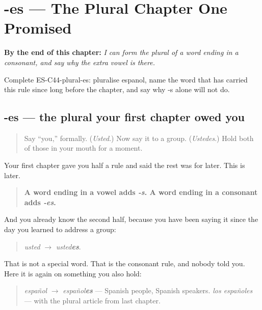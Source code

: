 
\chapter{-es --- The Plural Chapter One Promised}
\label{ch:plural-es}

\begin{chapteropening}
\textbf{By the end of this chapter:} \emph{I can form the plural of a word ending in a consonant, and say why the extra vowel is there.}

Complete ES-C44-plural-es: pluralise espanol, name the word that has carried this rule since long before the chapter, and say why -s alone will not do.
\end{chapteropening}

\section[-es]{-es — the plural your first chapter owed you}

\label{lesson:ES-C44-plural-es}



\begin{quote}
Say \textquotedblleft{}you,\textquotedblright{} formally. (\emph{Usted}.) Now say it to a group. (\emph{Ustedes}.) Hold both of those in your mouth for a moment.
\end{quote}

\begin{grammarlens}[title={Grammar Lens: you have been doing this for fifty chapters}]
Your first chapter gave you half a rule and said the rest was for later. This is later.

\begin{quote}
\textbf{A word ending in a vowel adds \emph{-s}. A word ending in a consonant adds \emph{-es}.}
\end{quote}

And you already know the second half, because you have been saying it since the day you learned to address a group:

\begin{quote}
\emph{usted} $\to$ \emph{usted\textbf{es}}.
\end{quote}

That is not a special word. That is the consonant rule, and nobody told you. Here it is again on something you also hold:

\begin{quote}
\emph{español} $\to$ \emph{español\textbf{es}} — Spanish people, Spanish speakers. \emph{los españoles} — with the plural article from last chapter.
\end{quote}
\end{grammarlens}

